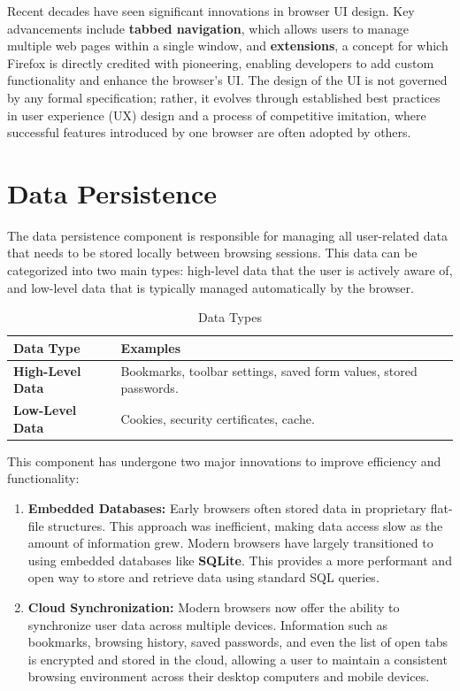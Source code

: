\documentclass{scrbook}
\begin{document}
Recent decades have seen significant innovations in browser UI design. Key advancements include \textbf{tabbed navigation}, which allows users to manage multiple web pages within a single window, and \textbf{extensions}, a concept for which Firefox is directly credited with pioneering, enabling developers to add custom functionality and enhance the browser's UI. The design of the UI is not governed by any formal specification; rather, it evolves through established best practices in user experience (UX) design and a process of competitive imitation, where successful features introduced by one browser are often adopted by others.

\section{Data Persistence}

The data persistence component is responsible for managing all user-related data that needs to be stored locally between browsing sessions. This data can be categorized into two main types: high-level data that the user is actively aware of, and low-level data that is typically managed automatically by the browser.

\begin{table}[h]
    \centering
    \begin{tabular}{|l|l|}
    \hline
    \textbf{Data Type} & \textbf{Examples} \\
    \hline
    \textbf{High-Level Data} & Bookmarks, toolbar settings, saved form values, stored passwords. \\
    \hline
    \textbf{Low-Level Data} & Cookies, security certificates, cache. \\
    \hline
    \end{tabular}
    \caption{Data Types}
\end{table}

This component has undergone two major innovations to improve efficiency and functionality:

\begin{enumerate}
    \item \textbf{Embedded Databases:} Early browsers often stored data in proprietary flat-file structures. This approach was inefficient, making data access slow as the amount of information grew. Modern browsers have largely transitioned to using embedded databases like \textbf{SQLite}. This provides a more performant and open way to store and retrieve data using standard SQL queries.
    \item \textbf{Cloud Synchronization:} Modern browsers now offer the ability to synchronize user data across multiple devices. Information such as bookmarks, browsing history, saved passwords, and even the list of open tabs is encrypted and stored in the cloud, allowing a user to maintain a consistent browsing environment across their desktop computers and mobile devices.
\end{enumerate}
\end{document}
